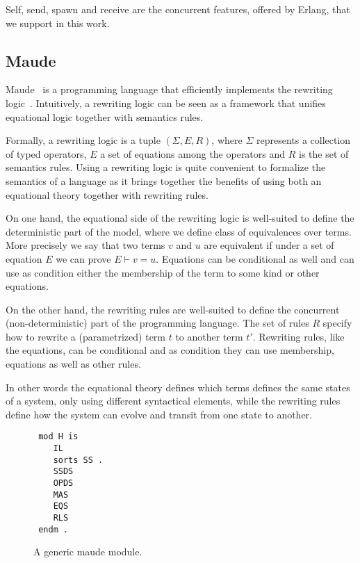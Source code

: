 \documentclass{article}[12pt,a4paper]
\theoremstyle{definition}
\begin{document}
Self, send, spawn and receive are the concurrent features, offered by Erlang, that we support in this work.

\subsection{Maude}

Maude~\cite{maude} is a programming language that efficiently implements the rewriting logic~\cite{MeseguerMS96}.
Intuitively, a rewriting logic can be seen as a framework that unifies equational
logic together with semantics rules.

Formally, a rewriting logic is a tuple $(\Sigma, E, R)$, where $\Sigma$
represents a collection of typed operators, $E$ a set of equations among the operators and $R$ is the set of
semantics rules. Using a rewriting logic is quite convenient to formalize the
semantics of a language as it brings together the benefits of using both an equational theory together with rewriting rules.

On one hand, the equational side of the rewriting logic is well-suited to define the deterministic part of the model, where
we define class of equivalences over terms. More precisely we say that two terms
$v$ and $u$ are equivalent if under a set of equation $E$ we can prove $E \vdash
v = u$. Equations can be conditional as well and can use as condition either the
membership of the term to some kind or other equations.

On the other hand, the rewriting rules are well-suited to define the concurrent
(non-deterministic) part of the programming language. The set of rules $R$
specify how to rewrite a (parametrized) term $t$ to another term $t'$.
Rewriting rules, like the equations, can be conditional and as condition they can
use membership, equations as well as other rules.

In other words the equational theory defines which terms defines the same states
of a system, only using different syntactical elements, while the rewriting rules
define how the system can evolve and transit from one state to another.

\begin{figure}[t]
\begin{verbatim}
 mod H is
    IL
    sorts SS .
    SSDS
    OPDS
    MAS
    EQS
    RLS
 endm .
\end{verbatim}
  
  \caption{A generic maude module.}
  \label{fig:maude-module}
\end{figure}
\end{document}
